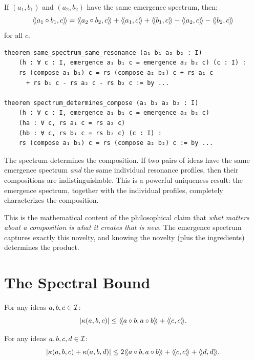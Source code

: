 \begin{theorem}
\label{thm:same-spectrum}
If $(a_1, b_1)$ and $(a_2, b_2)$ have the same emergence spectrum, then:
\[
  \rs{a_1 \compose b_1}{c} = \rs{a_2 \compose b_2}{c} + \rs{a_1}{c} + \rs{b_1}{c}
  - \rs{a_2}{c} - \rs{b_2}{c}
\]
for all $c$.
\end{theorem}

\begin{lstlisting}[caption={Spectral theory (IDT\_v3\_Emergence.lean)}]
theorem same_spectrum_same_resonance (a₁ b₁ a₂ b₂ : I)
    (h : ∀ c : I, emergence a₁ b₁ c = emergence a₂ b₂ c) (c : I) :
    rs (compose a₁ b₁) c = rs (compose a₂ b₂) c + rs a₁ c
      + rs b₁ c - rs a₂ c - rs b₂ c := by ...

theorem spectrum_determines_compose (a₁ b₁ a₂ b₂ : I)
    (h : ∀ c : I, emergence a₁ b₁ c = emergence a₂ b₂ c)
    (ha : ∀ c, rs a₁ c = rs a₂ c)
    (hb : ∀ c, rs b₁ c = rs b₂ c) (c : I) :
    rs (compose a₁ b₁) c = rs (compose a₂ b₂) c := by ...
\end{lstlisting}

\begin{interpretation}
The spectrum determines the composition. If two pairs of ideas have the same
emergence spectrum \emph{and} the same individual resonance profiles, then
their compositions are indistinguishable. This is a powerful uniqueness result:
the emergence spectrum, together with the individual profiles, completely
characterizes the composition.

This is the mathematical content of the philosophical claim that \emph{what
matters about a composition is what it creates that is new}. The emergence
spectrum captures exactly this novelty, and knowing the novelty (plus the
ingredients) determines the product.
\end{interpretation}


\section{The Spectral Bound}

\begin{theorem}
\label{thm:spectral-bound}
For any ideas $a, b, c \in \mathcal{I}$:
\[
  |\kappa(a, b, c)| \leq \langle\!\langle a \circ b, a \circ b \rangle\!\rangle + \langle\!\langle c, c \rangle\!\rangle.
\]
\end{theorem}

\begin{theorem}
\label{thm:double-spectral}
For any ideas $a, b, c, d \in \mathcal{I}$:
\[
  |\kappa(a, b, c) + \kappa(a, b, d)| \leq
  2\langle\!\langle a \circ b, a \circ b \rangle\!\rangle + \langle\!\langle c, c \rangle\!\rangle + \langle\!\langle d, d \rangle\!\rangle.
\]
\end{theorem}

